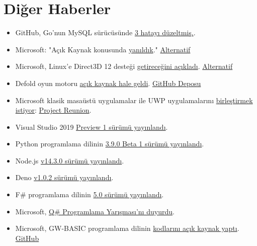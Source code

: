 \documentclass[11pt]{article}
\begin{document}
\section{Diğer Haberler}
\label{sec:orgcc072d3}
\begin{itemize}
\item GitHub, Go'nun MySQL sürücüsünde \href{https://github.blog/2020-05-20-three-bugs-in-the-go-mysql-driver/}{3 hatayı düzeltmiş.}.
\item Microsoft: "Açık Kaynak konusunda \href{https://www.zdnet.com/article/microsoft-we-were-wrong-about-open-source-but-luckily-you-can-change/}{yanıldık}." \href{https://www.theregister.co.uk/2020/05/15/microsoft\_brad\_smith\_open\_source/}{Alternatif}
\item Microsoft, Linux'e Direct3D 12 desteği \href{https://devblogs.microsoft.com/directx/directx-heart-linux/}{getireceğini açıkladı}. \href{https://www.phoronix.com/scan.php?page=news\_item\&px=Microsoft-DX12-WSL2}{Alternatif}
\item Defold oyun motoru \href{https://defold.com/opensource/}{açık kaynak hale geldi}. \href{https://github.com/defold/defold}{GitHub Deposu}
\item Microsoft klasik masaüstü uygulamalar ile UWP uygulamalarını \href{https://www.theverge.com/2020/5/19/21258697/microsoft-windows-project-reunion-win32-uwp-apps-apis-build}{birleştirmek
istiyor}: \href{https://github.com/microsoft/ProjectReunion}{Project Reunion}.
\item Visual Studio 2019 \href{https://docs.microsoft.com/en-us/visualstudio/releases/2019/release-notes-preview}{Preview 1 sürümü yayınlandı}.
\item Python programlama dilinin \href{https://pythoninsider.blogspot.com/2020/05/python-390b1-is-now-available-for.html}{3.9.0 Beta 1 sürümü yayınlandı}.
\item Node.js \href{https://nodejs.org/en/blog/release/v14.3.0/}{v14.3.0 sürümü yayınlandı}.
\item Deno \href{https://github.com/denoland/deno/releases/tag/v1.0.2}{v1.0.2 sürümü yayınlandı}.
\item F\# programlama dilinin \href{https://devblogs.microsoft.com/dotnet/f-5-update-for-net-5-preview-4/}{5.0 sürümü yayınlandı}.
\item Microsoft, \href{https://codeforces.com/blog/entry/77614}{Q\# Programlama Yarışması'nı duyurdu}.
\item Microsoft, GW-BASIC programlama dilinin \href{https://devblogs.microsoft.com/commandline/microsoft-open-sources-gw-basic/}{kodlarını açık kaynak yaptı}. \href{https://github.com/microsoft/GW-BASIC}{GitHub
}
\end{itemize}
\end{document}

